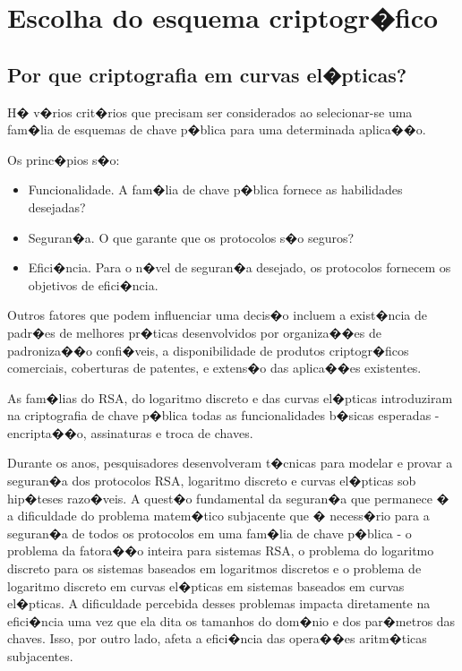 \documentclass[a4paper,capchap,espacoduplo,normaltoc]{abntepusp}
\begin{document}
\chapter{Escolha do esquema criptogr�fico}

\section{Por que criptografia em curvas el�pticas?}

H� v�rios crit�rios que precisam ser considerados ao selecionar-se uma fam�lia de esquemas de chave p�blica para uma determinada aplica��o.

Os princ�pios s�o:
\begin{itemize}
\item Funcionalidade. A fam�lia de chave p�blica fornece as habilidades desejadas?
\item Seguran�a. O que garante que os protocolos s�o seguros?
\item Efici�ncia. Para o n�vel de seguran�a desejado, os protocolos fornecem os objetivos de efici�ncia.
\end{itemize}

Outros fatores que podem influenciar uma decis�o incluem a exist�ncia de padr�es de melhores pr�ticas desenvolvidos por organiza��es de padroniza��o confi�veis, a disponibilidade de produtos criptogr�ficos comerciais, coberturas de patentes, e extens�o das aplica��es existentes.

As fam�lias do RSA, do logaritmo discreto e das curvas el�pticas introduziram na criptografia de chave p�blica todas as funcionalidades b�sicas esperadas - encripta��o, assinaturas e troca de chaves.

Durante os anos, pesquisadores desenvolveram t�cnicas para modelar e provar a seguran�a dos protocolos RSA, logaritmo discreto e curvas el�pticas sob hip�teses razo�veis. A quest�o fundamental da seguran�a que permanece � a dificuldade do problema matem�tico subjacente que � necess�rio para a seguran�a de todos os protocolos em uma fam�lia de chave p�blica - o problema da fatora��o inteira para sistemas RSA, o problema do logaritmo discreto para os sistemas baseados em logaritmos discretos e o problema de logaritmo discreto em curvas el�pticas em sistemas baseados em curvas el�pticas. A dificuldade percebida desses problemas impacta diretamente na efici�ncia uma vez que ela dita os tamanhos do dom�nio e dos par�metros das chaves. Isso, por outro lado, afeta a efici�ncia das opera��es aritm�ticas subjacentes.
\end{document}
